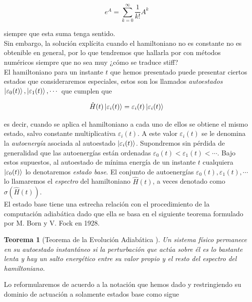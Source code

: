 \documentclass[11pt, spanish]{report}
\numberwithin{equation}{section}
\newtheorem{teo}[defin]{Teorema}
\numberwithin{defin}{section}
\begin{document}
\begin{equation}
e^A=\sum_{k=0}^\infty \frac{1}{k!}A^k
\end{equation}

siempre que esta suma tenga sentido.\\

Sin embargo, la solución explícita cuando el hamiltoniano no es constante no es obtenible en general, por lo que tendremos que hallarla por con métodos numéricos siempre que no sea muy ¿cómo se traduce stiff?\\

El hamiltoniano para un instante $t$ que hemos presentado puede presentar ciertos estados que consideraremos especiales, estos son los llamados \textit{autoestados} $\ket{\varepsilon_0(t)},\ket{\varepsilon_1(t)},\cdots$ que cumplen que

\begin{equation}
\hat{H}(t)\ket{\varepsilon_i(t)}=\varepsilon_i(t)\ket{\varepsilon_i(t)}
\end{equation}

es decir, cuando se aplica el hamiltoniano a cada uno de ellos se obtiene el mismo estado, salvo constante multiplicativa $\varepsilon_i(t)$. A este valor $\varepsilon_i(t)$ se le denomina la \textit{autoenergía} asociada al autoestado $\ket{\varepsilon_i(t)}$. Supondremos sin pérdida de generalidad que las autoenergías están ordenadas $\varepsilon_0(t)<\varepsilon_1(t)<\cdots$. Bajo estos supuestos, al autoestado de mínima energía de un instante $t$ cualquiera $\ket{\varepsilon_0(t)}$ lo denotaremos \textit{estado base}. El conjunto de autoenergías $\varepsilon_0(t),\varepsilon_1(t),\cdots$ lo llamaremos el \emph{espectro} del hamiltoniano $\hat{H}(t)$, a veces denotado como $\sigma(\hat{H}(t))$.\\

El estado base tiene una estrecha relación con el procedimiento de la computación adiabática dado que ella se basa en el siguiente teorema formulado por M. Born y V. Fock en 1928.\\

\begin{teo}[Teorema de la Evolución Adiabática \cite{Born1928}] Un sistema físico permanece en su autoestado instantáneo si la perturbación que actúa sobre él es lo bastante lenta y hay un salto energético entre su valor propio y el resto del espectro del hamiltoniano.
\end{teo}

Lo reformularemos de acuerdo a la notación que hemos dado y restringiendo su dominio de actuación a solamente estados base como sigue\\
\end{document}

